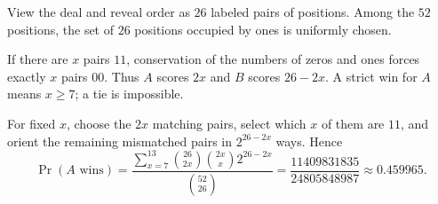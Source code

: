 View the deal and reveal order as $26$ labeled pairs of positions. Among the $52$ positions, the set of $26$ positions occupied by ones is uniformly chosen.

If there are $x$ pairs $11$, conservation of the numbers of zeros and ones forces exactly $x$ pairs $00$. Thus $A$ scores $2x$ and $B$ scores $26-2x$. A strict win for $A$ means $x\ge7$; a tie is impossible.

For fixed $x$, choose the $2x$ matching pairs, select which $x$ of them are $11$, and orient the remaining mismatched pairs in $2^{26-2x}$ ways. Hence
\[
\boxed{\Pr(A\text{ wins})=
\dfrac{\displaystyle\sum_{x=7}^{13}\binom{26}{2x}\binom{2x}{x}2^{26-2x}}{\binom{52}{26}}
=\dfrac{11409831835}{24805848987}\approx0.459965}.
\]
